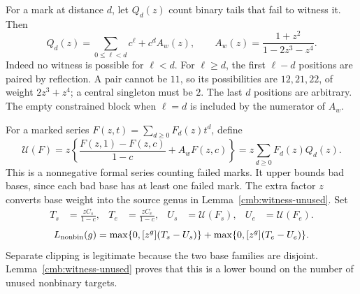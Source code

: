 \documentclass[11pt]{amsart}
\theoremstyle{definition}
\theoremstyle{remark}
\numberwithin{equation}{section}
\begin{document}
For a mark at distance $d$, let $Q_d(z)$ count binary tails that fail to
witness it. Then
\begin{equation}\label{cmb:failure-tail}
 Q_d(z)=\sum_{0\le\ell<d}c^\ell+c^dA_w(z),\qquad
 A_w(z)=\frac{1+z^2}{1-2z^3-z^4}.
\end{equation}
Indeed no witness is possible for $\ell<d$. For $\ell\ge d$, the first
$\ell-d$ positions are paired by reflection. A pair cannot be $11$, so its
possibilities are $12,21,22$, of weight $2z^3+z^4$; a central singleton
must be $2$. The last $d$ positions are arbitrary. The empty constrained
block when $\ell=d$ is included by the numerator of $A_w$.

For a marked series $F(z,t)=\sum_{d\ge0}F_d(z)t^d$, define
\begin{equation}\label{cmb:failure-operator}
 \mathcal U(F)=z\left\{\frac{F(z,1)-F(z,c)}{1-c}+A_wF(z,c)\right\}
             =z\sum_{d\ge0}F_d(z)Q_d(z).
\end{equation}
This is a nonnegative formal series counting failed marks. It upper bounds
bad bases, since each bad base has at least one failed mark. The extra
factor $z$ converts base weight into the source genus in
Lemma~\ref{cmb:witness-unused}. Set
\begin{align}
 T_s&=\frac{zC_s}{1-c},&T_e&=\frac{zC_e}{1-c},&
 U_s&=\mathcal U(F_s),&U_e&=\mathcal U(F_e).\nonumber
\end{align}
\begin{equation}
 L_{\rm nonbin}(g)=\max\{0,[z^g](T_s-U_s)\}
                  +\max\{0,[z^g](T_e-U_e)\}.\label{cmb:nonbinary-capacity}
\end{equation}
Separate clipping is legitimate because the two base families are disjoint.
Lemma~\ref{cmb:witness-unused} proves that this is a lower bound on the
number of unused nonbinary targets.
\end{document}
